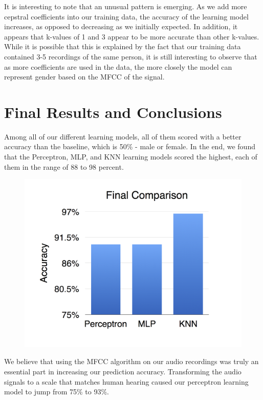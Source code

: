 \documentclass{article}
\begin{document}
It is interesting to note that an unusual pattern is emerging.  As we add more cepstral coefficients into our training data, the accuracy of the learning model increases, as opposed to decreasing as we initially expected.  In addition, it appears that k-values of 1 and 3 appear to be more accurate than other k-values.  While it is possible that this is explained by the fact that our training data contained 3-5 recordings of the same person, it is still interesting to observe that as more coefficients are used in the data, the more closely the model can represent gender based on the MFCC of the signal.

\section{Final Results and Conclusions}

Among all of our different learning models, all of them scored with a better accuracy than the baseline, which is 50\% - male or female. In the end, we found that the Perceptron, MLP, and KNN learning models scored the highest, each of them in the range of 88 to 98 percent.

\begin{figure}[H]
\includegraphics[width=\linewidth]{final_comparison}
\end{figure}

We believe that using the MFCC algorithm on our audio recordings was truly an essential part in increasing our prediction accuracy. Transforming the audio signals to a scale that matches human hearing caused our perceptron learning model to jump from 75\% to 93\%. 
\end{document}
